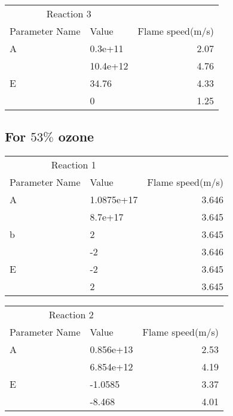   
     \begin{tabular}{llr}  
    \toprule
    \multicolumn{2}{c}{Reaction 3} \\
    \cmidrule(r){1-2}
    Parameter Name  & Value &  Flame speed(m/s)\\
    \midrule
    A      & 0.3e+11    & 2.07      \\
           &  10.4e+12     & 4.76       \\
   
    E      & 34.76    & 4.33      \\
           &   0     & 1.25       \\
    
    \bottomrule
  \end{tabular}
  
  
   \subsection{For $53\%$ ozone}
   \begin{tabular}{llr}  
    \toprule
    \multicolumn{2}{c}{Reaction 1} \\
    \cmidrule(r){1-2}
    Parameter Name  & Value &  Flame speed(m/s)\\
    \midrule
    A      & 1.0875e+17    & 3.646     \\
           &  8.7e+17     & 3.645       \\
    b      & 2    & 3.645      \\
           &    -2     & 3.646       \\
    E      & -2    & 3.645      \\
           &  2     & 3.645       \\
    
    \bottomrule
  \end{tabular}
  
   \begin{tabular}{llr}  
    \toprule
    \multicolumn{2}{c}{Reaction 2} \\
    \cmidrule(r){1-2}
    Parameter Name  & Value &  Flame speed(m/s)\\
    \midrule
    A      & 0.856e+13    & 2.53      \\
           &  6.854e+12     & 4.19       \\
   
    E      & -1.0585    & 3.37      \\
           &   -8.468     & 4.01       \\
    
    \bottomrule
  \end{tabular}
  
